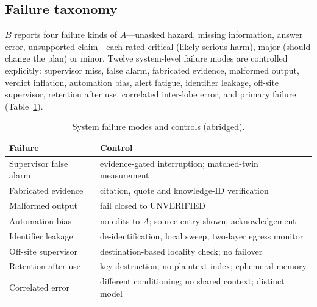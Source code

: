\documentclass[journal]{IEEEtran}
\begin{document}
\subsection{Failure taxonomy}
$B$ reports four failure kinds of $A$---unasked hazard, missing information, answer error, unsupported claim---each rated critical (likely serious harm), major (should change the plan) or minor. Twelve system-level failure modes are controlled explicitly: supervisor miss, false alarm, fabricated evidence, malformed output, verdict inflation, automation bias, alert fatigue, identifier leakage, off-site supervisor, retention after use, correlated inter-lobe error, and primary failure (Table~\ref{tab:failures}).

\begin{table}[!t]
\caption{System failure modes and controls (abridged).}
\label{tab:failures}
\centering\footnotesize
\begin{tabular}{@{}p{2.6cm}p{5.1cm}@{}}
\toprule
Failure & Control\\\midrule
Supervisor false alarm & evidence-gated interruption; matched-twin measurement\\
Fabricated evidence & citation, quote and knowledge-ID verification\\
Malformed output & fail closed to UNVERIFIED\\
Automation bias & no edits to $A$; source entry shown; acknowledgement\\
Identifier leakage & de-identification, local sweep, two-layer egress monitor\\
Off-site supervisor & destination-based locality check; no failover\\
Retention after use & key destruction; no plaintext index; ephemeral memory\\
Correlated error & different conditioning; no shared context; distinct model\\\bottomrule
\end{tabular}
\end{table}
\end{document}
